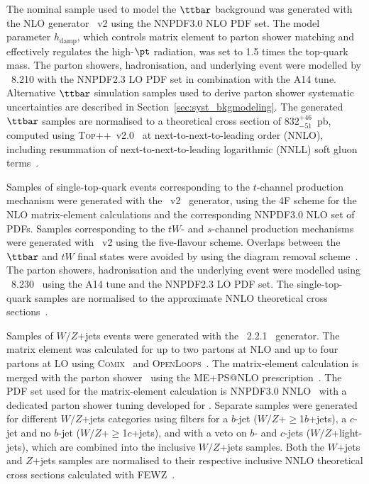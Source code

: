 \documentclass[PAPER, coverpage, atlasdraft=true, texlive=2016, UKenglish]{\ATLASLATEXPATH atlasdoc} %
\begin{document}
The nominal sample used to model the $\ttbar$ background was generated with the NLO generator {\powheg}~v2
using the NNPDF3.0 NLO PDF set. The {\powheg} model parameter $h_{\textrm{damp}}$, which controls 
matrix element to parton shower matching and effectively regulates the high-$\pt$ radiation, was set to 1.5 times the top-quark mass. 
The parton showers, hadronisation, and underlying event were modelled by {\pythia}~8.210 with the NNPDF2.3 LO PDF set in combination with the A14 tune.
Alternative $\ttbar$ simulation samples used to derive parton shower systematic uncertainties are described in Section~\ref{sec:syst_bkgmodeling}. 
The generated $\ttbar$ samples are normalised to a theoretical cross section of $832^{+46}_{-51}$~pb, 
computed using \textsc{Top++}~v2.0~\cite{Czakon:2011xx} at next-to-next-to-leading order (NNLO), 
including resummation of next-to-next-to-leading logarithmic (NNLL) soft gluon 
terms~\cite{Cacciari:2011hy,Baernreuther:2012ws,Czakon:2012zr,Czakon:2012pz,Czakon:2013goa}.

Samples of single-top-quark events corresponding to the $t$-channel production mechanism were generated with the 
{\powheg}~v2~\cite{Frederix:2012dh} generator, using the 4F scheme  for the NLO matrix-element calculations
and the corresponding NNPDF3.0 NLO set of PDFs.
Samples corresponding to the $tW$- and $s$-channel production mechanisms were generated 
with {\powheg}~v2 using the five-flavour scheme. Overlaps between the $\ttbar$ and $tW$ final states were avoided by using 
the diagram removal scheme~\cite{Frixione:2005vw}.
The parton showers, hadronisation and the underlying event were modelled using {\pythia}~8.230~\cite{Sjostrand:2006za} using the A14 tune and the NNPDF2.3 LO PDF set.
The single-top-quark samples are normalised to the approximate NNLO theoretical cross 
sections~\cite{Kidonakis:2011wy,Kidonakis:2010ux,Kidonakis:2010tc}. 

Samples of $W/Z$+jets events were generated with the {\sherpa}~2.2.1~\cite{Gleisberg:2008ta} generator. 
The matrix element was calculated for up to two partons at NLO and up to four partons at LO using 
\textsc{Comix}~\cite{Gleisberg:2008fv} and \textsc{OpenLoops}~\cite{Cascioli:2011va}. The matrix-element calculation 
is merged with the {\sherpa} parton shower~\cite{Schumann:2007mg} using the ME+PS@NLO prescription~\cite{Hoeche:2012yf}. 
The PDF set used for the matrix-element calculation is NNPDF3.0 NNLO~\cite{Ball:2014uwa} with a dedicated parton shower tuning developed for {\sherpa}. 
Separate samples were generated for different $W/Z$+jets categories using filters for a $b$-jet 
($W/Z$+$\geq$1$b$+jets), a $c$-jet and no $b$-jet ($W/Z$+$\geq$1$c$+jets), and with a veto on $b$- and $c$-jets 
($W/Z$+light-jets), which are combined into the inclusive $W/Z$+jets samples.
Both the $W$+jets and $Z$+jets samples are normalised to their respective inclusive NNLO theoretical 
cross sections calculated with \textsc{FEWZ}~\cite{Anastasiou:2003ds}.
\end{document}
